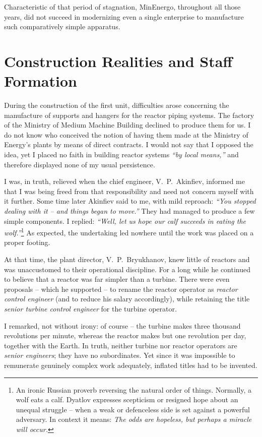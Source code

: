 \documentclass[openright]{bookest}
\begin{document}
Characteristic of that period of stagnation, MinEnergo, throughout all those years, did not succeed in modernizing even a single enterprise to manufacture such comparatively simple apparatus.

\section{Construction Realities and Staff Formation}

During the construction of the first unit, difficulties arose concerning the manufacture of supports and hangers for the reactor piping systems. The factory of the Ministry of Medium Machine Building declined to produce them for us. I do not know who conceived the notion of having them made at the Ministry of Energy's plants by means of direct contracts. I would not say that I opposed the idea, yet I placed no faith in building reactor systems \textit{``by local means,''} and therefore displayed none of my usual persistence.

I was, in truth, relieved when the chief engineer, V.~P.~Akinfiev, informed me that I was being freed from that responsibility and need not concern myself with it further. Some time later Akinfiev said to me, with mild reproach: \textit{``You stopped dealing with it -- and things began to move.''} They had managed to produce a few simple components. I replied: \textit{``Well, let us hope our calf succeeds in eating the wolf.''}\footnote{An ironic Russian proverb reversing the natural order of things. Normally, a wolf eats a calf. Dyatlov expresses scepticism or resigned hope about an unequal struggle -- when a weak or defenceless side is set against a powerful adversary. In context it means: \textit{The odds are hopeless, but perhaps a miracle will occur.}} As expected, the undertaking led nowhere until the work was placed on a proper footing.

At that time, the plant director, V.~P.~Bryukhanov, knew little of reactors and was unaccustomed to their operational discipline. For a long while he continued to believe that a reactor was far simpler than a turbine. There were even proposals -- which he supported -- to rename the reactor operator as \textit{reactor control engineer} (and to reduce his salary accordingly), while retaining the title \textit{senior turbine control engineer} for the turbine operator.

I remarked, not without irony: of course -- the turbine makes three thousand revolutions per minute, whereas the reactor makes but one revolution per day, together with the Earth. In truth, neither turbine nor reactor operators are \textit{senior engineers}; they have no subordinates. Yet since it was impossible to remunerate genuinely complex work adequately, inflated titles had to be invented.
\end{document}

